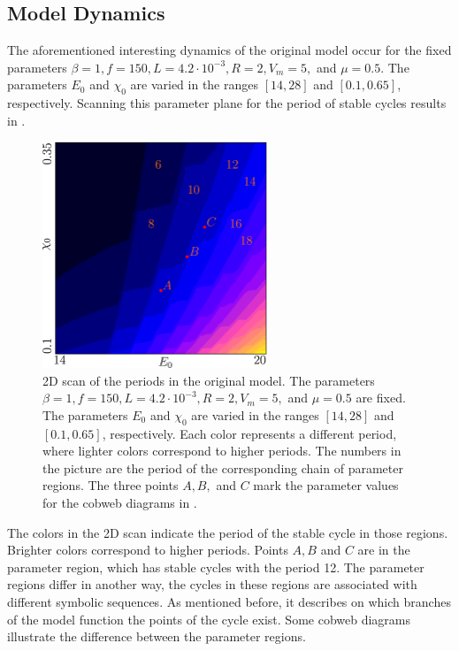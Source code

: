 \subsection{Model Dynamics}
\label{sec:state.og.dynamics}

The aforementioned interesting dynamics of the original model occur for the fixed parameters $\beta = 1, f = 150, L = 4.2 \cdot 10^{-3}, R = 2, V_m = 5,$ and $\mu = 0.5$.
The parameters $E_0$ and $\chi_0$ are varied in the ranges $[14, 28]$ and $[0.1, 0.65]$, respectively.
Scanning this parameter plane for the period of stable cycles results in .

\begin{figure}
	\centering
	\includegraphics[width=0.6\textwidth]{../Figures/2/2.3/result.png}
	\caption[2D scan of the periods in the original model]{
		2D scan of the periods in the original model.
		The parameters $\beta = 1, f = 150, L = 4.2 \cdot 10^{-3}, R = 2, V_m = 5,$ and $\mu = 0.5$ are fixed.
		The parameters $E_0$ and $\chi_0$ are varied in the ranges $[14, 28]$ and $[0.1, 0.65]$, respectively.
		Each color represents a different period, where lighter colors correspond to higher periods.
		The numbers in the picture are the period of the corresponding chain of parameter regions.
		The three points $A, B,$ and $C$ mark the parameter values for the cobweb diagrams in .
	}
	\label{fig:state.og.dynamics.period}
\end{figure}

The colors in the 2D scan  indicate the period of the stable cycle in those regions.
Brighter colors correspond to higher periods.
Points $A, B$ and $C$ are in the parameter region, which has stable cycles with the period 12.
The parameter regions differ in another way, the cycles in these regions are associated with different symbolic sequences.
As mentioned before, it describes on which branches of the model function the points of the cycle exist.
Some cobweb diagrams illustrate the difference between the parameter regions.

